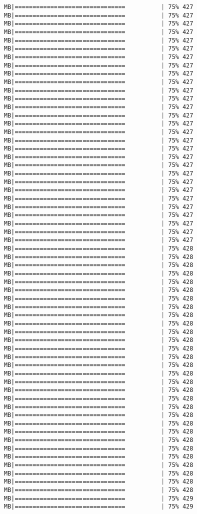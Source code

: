 \documentclass[
]{article}
\begin{document}
\begin{verbatim}
MB|===============================          | 75% 427 MB|===============================          | 75% 427 MB|===============================          | 75% 427 MB|===============================          | 75% 427 MB|===============================          | 75% 427 MB|===============================          | 75% 427 MB|===============================          | 75% 427 MB|===============================          | 75% 427 MB|===============================          | 75% 427 MB|===============================          | 75% 427 MB|===============================          | 75% 427 MB|===============================          | 75% 427 MB|===============================          | 75% 427 MB|===============================          | 75% 427 MB|===============================          | 75% 427 MB|===============================          | 75% 427 MB|===============================          | 75% 427 MB|===============================          | 75% 427 MB|===============================          | 75% 427 MB|===============================          | 75% 427 MB|===============================          | 75% 427 MB|===============================          | 75% 427 MB|===============================          | 75% 427 MB|===============================          | 75% 427 MB|===============================          | 75% 427 MB|===============================          | 75% 427 MB|===============================          | 75% 427 MB|===============================          | 75% 427 MB|===============================          | 75% 427 MB|===============================          | 75% 428 MB|===============================          | 75% 428 MB|===============================          | 75% 428 MB|===============================          | 75% 428 MB|===============================          | 75% 428 MB|===============================          | 75% 428 MB|===============================          | 75% 428 MB|===============================          | 75% 428 MB|===============================          | 75% 428 MB|===============================          | 75% 428 MB|===============================          | 75% 428 MB|===============================          | 75% 428 MB|===============================          | 75% 428 MB|===============================          | 75% 428 MB|===============================          | 75% 428 MB|===============================          | 75% 428 MB|===============================          | 75% 428 MB|===============================          | 75% 428 MB|===============================          | 75% 428 MB|===============================          | 75% 428 MB|===============================          | 75% 428 MB|===============================          | 75% 428 MB|===============================          | 75% 428 MB|===============================          | 75% 428 MB|===============================          | 75% 428 MB|===============================          | 75% 428 MB|===============================          | 75% 428 MB|===============================          | 75% 428 MB|===============================          | 75% 428 MB|===============================          | 75% 428 MB|===============================          | 75% 429 MB|===============================          | 75% 429 
\end{verbatim}
\end{document}

